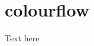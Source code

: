 \chapter{colourflow} 
\label{sec:presets}
\lstset{style=6502Style}
Text here
\captionsetup[figure]{font=tiny}
\clearpage

